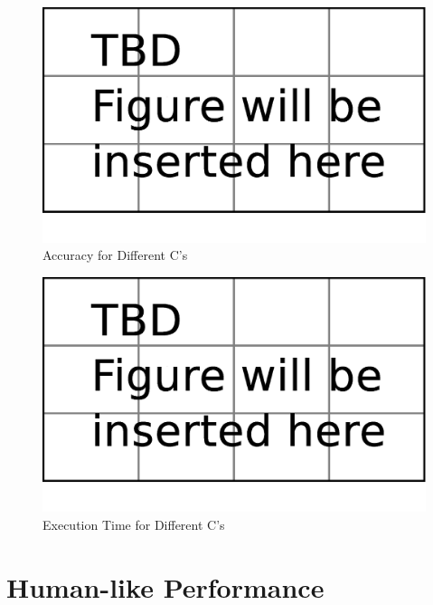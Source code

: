 \begin{figure}[tp]
   \begin{center}
      \includegraphics[width=\textwidth]{fig/TBDFigure}

   \end{center}
   \caption{Accuracy for Different C's}
   \label{fig:c_accu}
\end{figure}
\begin{figure}[tp]
   \begin{center}
      \includegraphics[width=\textwidth]{fig/TBDFigure}

   \end{center}
   \caption{Execution Time for Different C's}
   \label{fig:c_time}
\end{figure}

\section{Human-like Performance}

